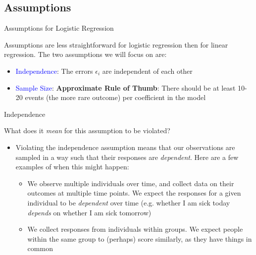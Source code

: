 \documentclass[10pt,t]{beamer}
\begin{document}
%

\subsection{Assumptions}

\begin{frame}{Assumptions for Logistic Regression}
	
	Assumptions are less straightforward for logistic regression then for linear regression. The two assumptions we will focus on are:
	
	\medskip
	
	\begin{itemize}
		
			\item \textcolor{blue}{Independence}: The errors $\epsilon_i$ are independent of each other
			
		
		\medskip
		
	\item \textcolor{blue}{Sample Size}: \textbf{Approximate Rule of Thumb}: There should be at least 10-20 events (the more rare outcome) per coefficient in the model
	\end{itemize} 

		

	
	
	
\end{frame}

\begin{frame}{Independence}
	
	\vspace{0.3cm}
	
	What does it \textit{mean} for this assumption to be violated?
	
	\vspace{0.3cm}
	
	\begin{itemize}
		\item[] Violating the independence assumption means that our observations are sampled in a way such that their responses are \textit{dependent}. Here are a few examples of when this might happen:
		\begin{itemize}
			\item We observe multiple individuals over time, and collect data on their outcomes at multiple time points. We expect the responses for a given individual to be \textit{dependent} over time (e.g. whether I am sick today \textit{depends} on whether I am sick tomorrow)
			\medskip
			\item We collect responses from individuals within groups. We expect people within the same group to (perhaps) score similarly, as they have things in common
		\end{itemize}
	\end{itemize}

\end{frame}
\end{document}
